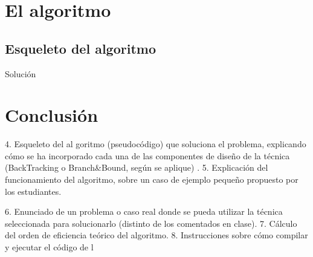 \documentclass[a4paper, 11pt]{article}
\makeatletter
\def\BState{\State\hskip-\ALG@thistlm}
\makeatother
\begin{document}
\section{El algoritmo}

\subsection{Esqueleto del algoritmo}

\begin{algorithm}
\caption{Solución}\label{euclid}
\end{algorithm}

\section{Conclusión}


4.
Esqueleto  del  al
goritmo  (pseudocódigo)  que  soluciona  el  problema,  explicando 
cómo  se  ha  incorporado  cada  una  de  las  componentes 
de  diseño  de  la  técnica 
(BackTracking o Branch\&Bound, según se aplique)
.
5.
Explicación   del   funcionamiento   del   algoritmo,   sobre   un   caso   de   ejemplo 
pequeño propuesto por los estudiantes.

 
6.
Enunciado  de  un  problema  o  caso  real  donde  se  pueda  utilizar 
la  técnica 
seleccionada
para solucionarlo (distinto de los comentados en clase).
7.
Cálculo del orden de eficiencia teórico del algoritmo.
8.
Instrucciones sobre 
cómo compilar y ejecutar el código de l
\end{document}
